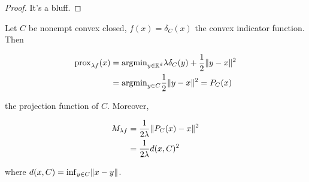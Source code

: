 \begin{proof}
    It's a bluff.
\end{proof}

\begin{example}
    
    Let $C$ be nonempt convex closed, $f(x) = \delta_C(x)$ the convex indicator function. Then 

    \begin{align*}
        \mathrm{prox}_{\lambda f}(x) &= \mathrm{argmin}_{y \in \mathbb{R}^d} \lambda \delta_C(y) + \frac12 \lVert y-x \rVert^2 \\
            &= \mathrm{argmin}_{y \in C} \frac12 \lVert y - x \rVert^2  = P_C(x)
    \end{align*}

    the projection function of $C$. Moreover, 

    \begin{align*}
        M_{\lambda f} &= \frac{1}{2\lambda} \lVert P_C(x) - x \rVert^2 \\
            &= \frac{1}{2\lambda} d(x,C)^2
    \end{align*}

    where $d(x,C) = \inf_{y \in C} \lVert x - y \rVert$.

\end{example}

